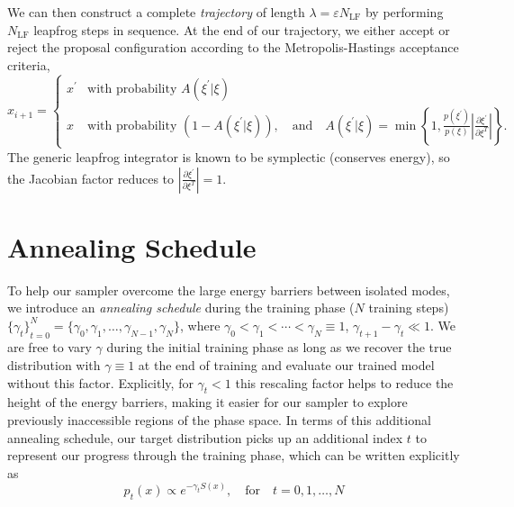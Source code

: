 \documentclass{article} %
\begin{document}
%
We can then construct a complete \emph{trajectory} of length \(\lambda = \varepsilon N_{\mathrm{LF}}\) by
performing \(N_{\mathrm{LF}}\) leapfrog steps in sequence.
%
At the end of our trajectory, we either accept or reject the proposal configuration according to the Metropolis-Hastings
acceptance criteria,
%
\begin{equation}
   x_{i+1} =
   \begin{cases}%
      x^{\prime} &\mbox{with probability } A(\xi^{\prime}|\xi) \\
      x &\mbox{with probability } (1 - A(\xi^{\prime}|\xi)), \quad\text{and}\quad%
         A(\xi^{\prime}|\xi) = \min\left\{%
            1, \frac{p(\xi^{\prime})}{p(\xi)}\left|\frac{\partial{\xi^{\prime}}}{\partial\xi^{T}}\right|%
         \right\}.
   \end{cases}
   \label{eq:mhcriteria}
\end{equation}
%
The generic leapfrog integrator is known to be symplectic (conserves energy), so the Jacobian factor reduces to
\(\left|\frac{\partial\xi^{\prime}}{\partial\xi^{T}}\right| = 1\). 
%
\section{\label{sec:annealing}Annealing Schedule}
%
To help our sampler overcome the large energy barriers between isolated modes, we introduce an \emph{annealing schedule}
during the training phase (\(N\) training steps) \({\{\gamma_{t}\}}_{t=0}^{N} = \{\gamma_{0}, \gamma_{1}, \ldots,
\gamma_{N-1}, \gamma_{N}\}\), where \(\gamma_{0} < \gamma_{1} < \cdots < \gamma_{N} \equiv 1\), \(\gamma_{t+1} -
\gamma_{t} \ll 1\).
%
We are free to vary \(\gamma\) during the initial training phase as long as we recover the true distribution
with \(\gamma \equiv 1\) at the end of training and evaluate our trained model without this factor.
%
Explicitly, for \(\gamma_{t} < 1\) this rescaling factor helps to reduce the height of the energy barriers, making it
easier for our sampler to explore previously inaccessible regions of the phase space.
%
In terms of this additional annealing schedule, our target distribution picks up an additional index \(t\) to represent
our progress through the training phase, which can be written explicitly as 
%
\begin{equation}
   p_{t}(x)\propto e^{-\gamma_{t} S(x)},\quad\text{for}\quad t=0, 1, \ldots, N
   \label{eq:targetannealing}
\end{equation}
%
\end{document}
